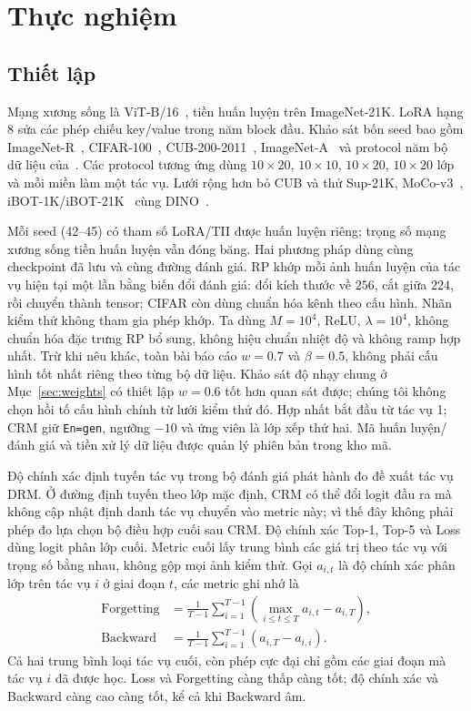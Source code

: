 \documentclass[runningheads]{llncs}
\begin{document}
\section{Thực nghiệm}
\label{sec:exp}

\subsection{Thiết lập}
\label{sec:setup}

Mạng xương sống là ViT-B/16~\cite{ref_vit}, tiền huấn luyện trên ImageNet-21K.
LoRA hạng $8$ sửa các phép chiếu key/value trong năm block đầu. Khảo sát bốn seed bao gồm ImageNet-R~\cite{ref_imr}, CIFAR-100~\cite{ref_cifar},
CUB-200-2011~\cite{ref_cub}, ImageNet-A~\cite{ref_ima} và protocol năm bộ dữ
liệu của~\cite{ref_hrmpet}. Các protocol tương ứng dùng $10\times20$,
$10\times10$, $10\times20$, $10\times20$ lớp và mỗi miền làm một tác vụ. Lưới
rộng hơn bỏ CUB và thử Sup-21K, MoCo-v3~\cite{ref_moco},
iBOT-1K/iBOT-21K~\cite{ref_ibot} cùng DINO~\cite{ref_dino}.

Mỗi seed (42--45) có tham số LoRA/TII được huấn luyện riêng; trọng số mạng xương
sống tiền huấn luyện vẫn đóng băng. Hai phương pháp dùng cùng checkpoint đã lưu
và cùng đường đánh giá. RP khớp mỗi ảnh huấn luyện của tác vụ hiện tại một lần
bằng biến đổi đánh giá: đổi kích thước về $256$, cắt giữa $224$, rồi chuyển
thành tensor; CIFAR còn dùng chuẩn hóa kênh theo cấu hình. Nhãn kiểm thử không
tham gia phép khớp. Ta dùng $M=10^4$, ReLU, $\lambda=10^4$, không chuẩn hóa
đặc trưng RP bổ sung, không hiệu chuẩn nhiệt độ và không ramp hợp nhất. Trừ khi
nêu khác, toàn bài báo cáo $w=0.7$ và $\beta=0.5$, không phải cấu hình tốt nhất
riêng theo từng bộ dữ liệu. Khảo sát độ nhạy chung ở Mục~\ref{sec:weights} có
thiết lập $w=0.6$ tốt hơn quan sát được; chúng tôi không chọn hồi tố cấu hình
chính từ lưới kiểm thử đó. Hợp nhất bắt đầu từ tác vụ 1; CRM giữ
\texttt{En=gen}, ngưỡng $-10$ và ứng viên là lớp xếp thứ hai. Mã huấn
luyện/đánh giá và tiền xử lý dữ liệu được quản lý phiên bản trong kho mã.

Độ chính xác định tuyến tác vụ trong bộ đánh giá phát hành đo đề xuất tác vụ
DRM. Ở đường định tuyến theo lớp mặc định, CRM có thể đổi logit đầu ra mà không
cập nhật định danh tác vụ chuyển vào metric này; vì thế đây không phải phép đo
lựa chọn bộ điều hợp cuối sau CRM. Độ chính xác Top-1, Top-5 và Loss dùng logit
phân lớp cuối. Metric cuối lấy
trung bình các giá trị theo tác vụ với trọng số bằng nhau, không gộp mọi ảnh
kiểm thử. Gọi $a_{i,t}$ là độ chính xác phân lớp trên tác vụ $i$ ở giai đoạn
$t$, các metric ghi nhớ là
\begin{align}
\mathrm{Forgetting}
 &= \frac{1}{T-1}\sum_{i=1}^{T-1}
 \left(\max_{i\le t\le T} a_{i,t}-a_{i,T}\right),\\
\mathrm{Backward}
 &= \frac{1}{T-1}\sum_{i=1}^{T-1}(a_{i,T}-a_{i,i}).
\label{eq:metrics}
\end{align}
Cả hai trung bình loại tác vụ cuối, còn phép cực đại chỉ gồm các giai đoạn mà
tác vụ $i$ đã được học. Loss và Forgetting càng thấp càng tốt; độ chính xác và
Backward càng cao càng tốt, kể cả khi Backward âm.
\end{document}

